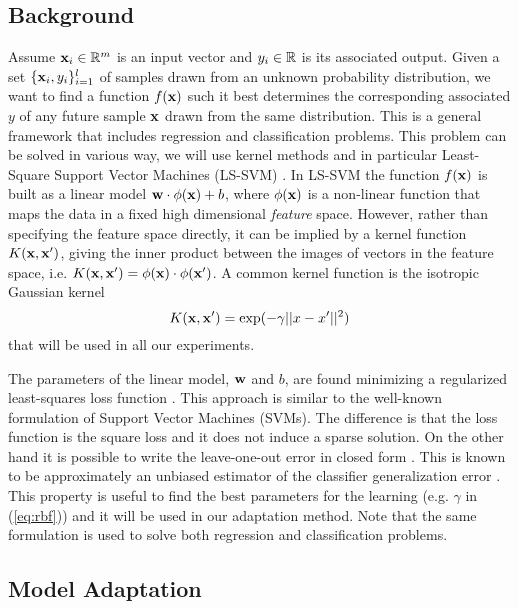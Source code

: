 \subsection{Background}

Assume $\mathbf{x}_i \in \mathbb{R}^m$ is an input vector and $y_i \in \mathbb{R}$ is its associated output.
Given a set $\{\mathbf{x}_i,y_i\}_{i=1}^l$ of samples drawn from an unknown probability
distribution, we want to find a function $f(\mathbf{x})$ such it
best determines the corresponding associated $y$ of any future sample $\mathbf{x}$
drawn from the same distribution.
This is a general framework that includes regression and classification problems.
This problem can be solved in various way, we will use kernel methods and in
particular Least-Square Support Vector Machines (LS-SVM) \cite{Cristianini00}.
In LS-SVM the function $f(\mathbf{x})$ is built as a linear model
$\mathbf{w} \cdot \phi(\mathbf{x}) + b$, where $\phi(\mathbf{x})$ is a non-linear function that maps
the data in a fixed high dimensional \emph{feature} space.
However, rather than specifying the feature space directly,
it can be implied by a kernel function $K(\mathbf{x},\mathbf{x}')$, giving the
inner product between the images of vectors in the feature
space, i.e. $K(\mathbf{x},\mathbf{x}')=\phi(\mathbf{x}) \cdot \phi(\mathbf{x}')$.
A common kernel function is the isotropic Gaussian kernel
\begin{equation}
	K(\xx,\xx')=\exp(-\gamma ||x-x'||^2)
	\label{eq:rbf}
\end{equation}
that will be used in all our experiments.

The parameters of the linear model, $\mathbf{w}$ and $b$, are found minimizing a
regularized least-squares loss function \cite{Cristianini00}.
This approach is similar to the well-known formulation of Support Vector
Machines (SVMs). The difference is that the loss function is the square loss and it
does not induce a sparse solution. On the other hand it is possible to write
the leave-one-out error in closed form \cite{Rifkin07}. This is known to be
approximately an unbiased estimator of the classifier generalization error
\cite{LuntzB69}. This property is useful to find the best parameters for the
learning (e.g. $\gamma$ in (\ref{eq:rbf})) and it will be used in our
adaptation method. Note that the same formulation is used to solve both
regression and classification problems.

\subsection{Model Adaptation}

